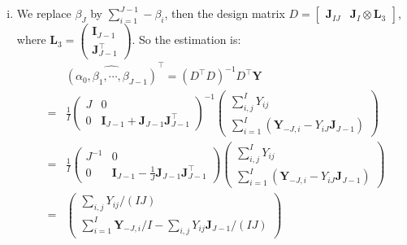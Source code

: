 \documentclass[12pt]{article}
\newcommand{\ttt}[1]{\textbf{#1}}
\begin{document}
\begin{enumerate}
\begin{enumerate}[A.]
\begin{enumerate}[i.]
            \item
            We replace $\beta_J$ by $\sum_{i=1}^{J-1} -\beta_i$, then the design matrix $D = \begin{bmatrix} \ttt{J}_{IJ} & \ttt{J}_I \otimes \ttt{L}_3 \end{bmatrix}$, where $\ttt{L}_3 = \begin{pmatrix} \ttt{I}_{J-1} \\ \ttt{J}^\top_{J-1} \end{pmatrix}$.
            So the estimation is:
                \begin{eqnarray}
                    & &\widehat{(\alpha_0,\beta_1,\cdots,\beta_{J-1})}^\top = (D^\top D)^{-1} D^\top \ttt{Y} \\
                                                                     &=& \frac{1}{I} \begin{pmatrix}
                                                                                        J & 0 \\
                                                                                        0 & \ttt{I}_{J-1} + \ttt{J}_{J-1}\ttt{J}_{J-1}^\top
                                                                                     \end{pmatrix}^{-1} \begin{pmatrix} \sum_{i,j}^I Y_{ij} \\ \sum_{i=1}^{I} (\ttt{Y}_{-J,i} - Y_{iJ} \ttt{J}_{J-1})\end{pmatrix} \\
                                                                     &=& \frac{1}{I} \begin{pmatrix}
                                                                        J^{-1} & 0 \\
                                                                        0 & \ttt{I}_{J-1} - \frac{1}{J}\ttt{J}_{J-1}\ttt{J}_{J-1}^\top
                                                                     \end{pmatrix} \begin{pmatrix} \sum_{i,j}^I Y_{ij} \\ \sum_{i=1}^{I} (\ttt{Y}_{-J,i} - Y_{iJ} \ttt{J}_{J-1})\end{pmatrix} \\
                                                                     &=& \begin{pmatrix} \sum_{i,j} Y_{ij} / (IJ) \\ \sum_{i=1}^{I} \ttt{Y}_{-J,i} / I - \sum_{i,j} Y_{ij} \ttt{J}_{J-1} / (IJ)\end{pmatrix}
                \end{eqnarray}
        \end{enumerate}
    \end{enumerate}
    

\end{enumerate}
\end{document}
